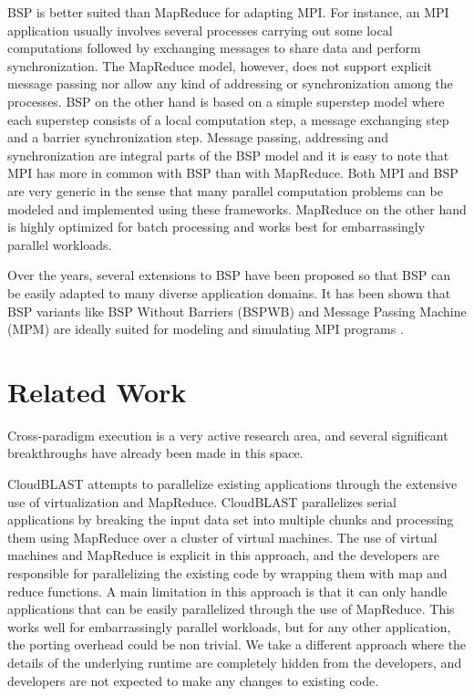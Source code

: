 \documentclass[conference,10pt] {IEEEtran}
\begin{document}
BSP is better suited than MapReduce for adapting MPI. For instance, an MPI application usually involves several processes carrying out some local computations followed by exchanging messages to share data and perform synchronization. The MapReduce model, however, does not support explicit message passing nor allow any kind of addressing or synchronization among the processes. BSP on the other hand is based on a simple superstep model where each superstep consists of a local computation step, a message exchanging step and a barrier synchronization step. Message passing, addressing and synchronization are integral parts of the BSP model and it is easy to note that MPI has more in common with BSP than with MapReduce. Both MPI and BSP are very generic in the sense that many parallel computation problems can be modeled and implemented using these frameworks. MapReduce on the other hand is highly optimized for batch processing and works best for embarrassingly parallel workloads. 

Over the years, several extensions to BSP have been proposed so that BSP can be easily adapted to many diverse application domains. It has been shown that BSP variants like BSP Without Barriers (BSPWB) and Message Passing Machine (MPM) are ideally suited for modeling and simulating MPI programs \cite{Roda:1998:BSP:945406.938371}.

\section{Related Work}
\label{sec:related_work}

Cross-paradigm execution is a very active research area, and several significant breakthroughs have already been made in this space.

CloudBLAST \cite{MTF08} attempts to parallelize existing applications through the extensive use of virtualization and MapReduce. CloudBLAST parallelizes serial applications by breaking the input data set into multiple chunks and processing them using MapReduce over a cluster of virtual machines. The use of virtual machines and MapReduce is explicit in this approach, and the developers are responsible for parallelizing the existing code by wrapping them with map and reduce functions. A main limitation in this approach is that it can only handle applications that can be easily parallelized through the use of MapReduce. This works well for embarrassingly parallel workloads, but for any other application, the porting overhead could be non trivial. We take a different approach where the details of the underlying runtime are completely hidden from the developers, and developers are not expected to make any changes to existing code.
\end{document}

